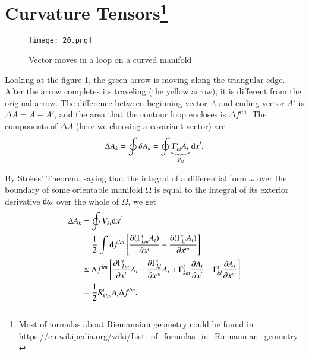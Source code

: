 \documentclass[openany,10pt]{book}
\theoremstyle{definition}
\theoremstyle{definition}
\theoremstyle{remark}
\begin{document}
\section[Curvature Tensors]{Curvature Tensors\footnote{Most of formulas about Riemannian geometry could be found in \url{https://en.wikipedia.org/wiki/List_of_formulas_in_Riemannian_geometry}}}
\begin{figure}[htbp]
    \centering
    \texttt{[image: 20.png]}
    \caption{Vector moves in a loop on a curved manifold}
    \label{Vector diff}
\end{figure}
Looking at the figure \ref{Vector diff}, the green arrow is moving along the triangular edge. After the arrow completes its traveling (the yellow arrow), it is different from the original arrow. The difference between beginning vector $A$ and ending vector $A'$ is $\Delta A=A-A'$, and the area that the contour loop encloses is $\Delta f^{lm}$. The components of  $\Delta A$ (here we choosing a covariant vector) are
\begin{equation}
    \Delta A_k=\oint \delta A_k=\oint\underbrace{\Gamma^i_{kl}A_i}_{V_{kl}} {\rm{d}}x^l.
\end{equation}

By Stokes' Theorem, saying that the integral of a differential form  $\omega$ over the boundary of some orientable manifold Ω is equal to the integral of its exterior derivative ${\rm d}\omega$ over the whole of $\Omega$, we get
\begin{equation}\label{Riemann derivation}\begin{aligned}
    \Delta A_k&=\oint V_{kl}{\rm d}x^l\\
    &=\frac12\int {\rm{d}}f^{lm}\left[\frac{\partial (\Gamma^i_{km}A_i)}{\partial x^l}-\frac{\partial (\Gamma^i_{kl}A_i)}{\partial x^m}\right]\\
    &\approxeq \Delta f^{lm}\left[\frac{\partial\Gamma^i_{km}}{\partial x^l}A_i-\frac{\partial\Gamma^i_{kl}}{\partial x^m}A_i+\Gamma^i_{km}\frac{\partial A_i}{\partial x^l}-\Gamma^i_{kl}\frac{\partial A_i}{\partial x^m}\right]\\
    &=\frac12 R^i_{klm}A_i\Delta f^{lm}.
\end{aligned}
\end{equation}
\end{document}
